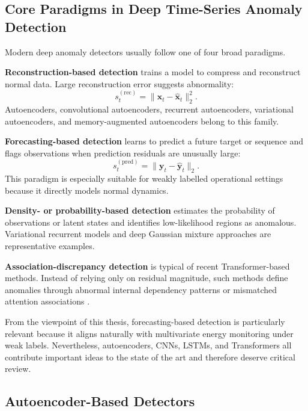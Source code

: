 \subsection{Core Paradigms in Deep Time-Series Anomaly Detection}

Modern deep anomaly detectors usually follow one of four broad paradigms.

\textbf{Reconstruction-based detection} trains a model to compress and reconstruct normal data. Large reconstruction error suggests abnormality:
\begin{equation}
	s_t^{(\mathrm{rec})} = \|\mathbf{x}_t - \hat{\mathbf{x}}_t\|_2^2.
	\label{eq:sota_reconstruction}
\end{equation}
Autoencoders, convolutional autoencoders, recurrent autoencoders, variational autoencoders, and memory-augmented autoencoders belong to this family.

\textbf{Forecasting-based detection} learns to predict a future target or sequence and flags observations when prediction residuals are unusually large:
\begin{equation}
	s_t^{(\mathrm{pred})} = \|\mathbf{y}_t - \hat{\mathbf{y}}_t\|_2.
	\label{eq:sota_forecast}
\end{equation}
This paradigm is especially suitable for weakly labelled operational settings because it directly models normal dynamics.

\textbf{Density- or probability-based detection} estimates the probability of observations or latent states and identifies low-likelihood regions as anomalous. Variational recurrent models and deep Gaussian mixture approaches are representative examples.

\textbf{Association-discrepancy detection} is typical of recent Transformer-based methods. Instead of relying only on residual magnitude, such methods define anomalies through abnormal internal dependency patterns or mismatched attention associations \cite{xu2022anomalytransformer,tuli2022tranad}.

From the viewpoint of this thesis, forecasting-based detection is particularly relevant because it aligns naturally with multivariate energy monitoring under weak labels. Nevertheless, autoencoders, CNNs, LSTMs, and Transformers all contribute important ideas to the state of the art and therefore deserve critical review.

\subsection{Autoencoder-Based Detectors}

